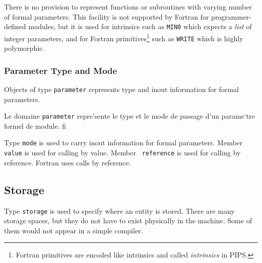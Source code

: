 There is no provision to represent functions or subroutines with varying
number of formal parameters. This facility is not supported by Fortran
for programmer-defined modules, but it is used for intrinsics such as
\verb+MIN0+ which expects a {\em list} of integer parameters, and for
Fortran primitives\footnote{Fortran primitives are encoded like
intrinsics and called {\em intrinsics} in PIPS.} such as {\tt WRITE}
which is highly polymorphic.

\iffalse
Il n'y a pas de moyens simples pour repre'senter les fonctions ou
sous-programmes a` nombre variable de parame`tres. Bien que ce soit
interdit pour les modules de'finis par le programmeur, de nombreux
intrinse`ques comme \verb+MIN0+ ou \verb+WRITE+ n'ont pas un profil
unique.
\fi

\subsubsection{Parameter Type and Mode}
\label{subsubsection-parameter}


Objects of type {\tt parameter} represents type and inout information
for formal parameters.

\iffalse
Le domaine \verb/parameter/ repre'sente le type et le mode de passage d'un
parame`tre formel de module. 
fi


Type {\tt mode} is used to carry inout information for formal
parameters. Member {\tt value} is used for calling by value. Member {\tt
reference} is used for calling by reference. Fortran uses calls by reference.

\iffalse
Le domaine \verb/mode/ repre'sente le mode de passage d'un parame`tre
formel de module. Le domaine contient un objet du domaine \verb/value/
pour le mode de passage par valeur et \verb/reference/ pour le passage
par adresse.
\fi

\subsection{Storage}
\label{subsection-storage}

{}

Type {\tt storage} is used to specify where an entity is stored. There
are many storage spaces, but they do not have to exist physically in the
machine. Some of them would not appear in a simple compiler.

